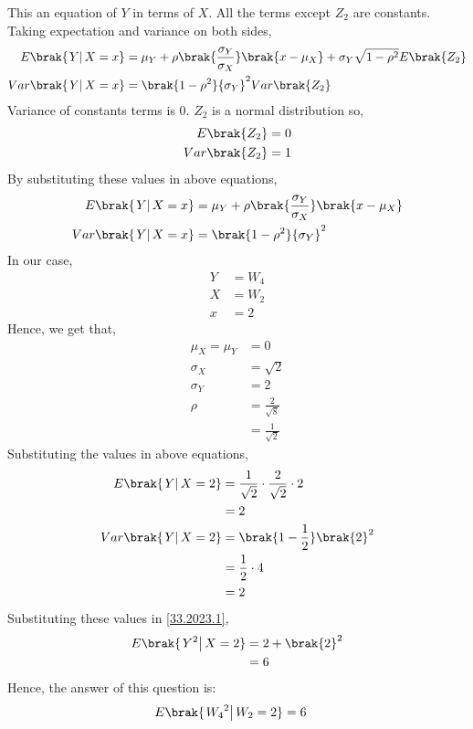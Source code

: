 \documentclass[journal,12pt,twocolumn]{IEEEtran}
\theoremstyle{remark}
\begin{document}
This an equation of $Y$ in terms of $X$. All the terms except $Z_2$ are constants. Taking expectation and variance on both sides, 
\begin{align}
E\brak{\left.Y\right | X=x} &= \mu_Y +\rho\brak{\frac{\sigma_Y}{\sigma_X}}\brak{x - \mu_X} + \sigma_Y\sqrt{1 - {\rho}^2}E\brak{Z_2}\\
Var\brak{\left.Y\right | X=x} &= {\brak{1 - {\rho}^2}{\sigma_Y}^2}Var\brak{Z_2}
\end{align}
Variance of constants terms is 0. $Z_2$ is a normal distribution so,
\begin{align}
E\brak{Z_2} &= 0\\
Var\brak{Z_2} &= 1
\end{align}
By substituting these values in above equations,
\begin{align}
E\brak{\left.Y\right | X=x} &= \mu_Y +\rho\brak{\frac{\sigma_Y}{\sigma_X}}\brak{x - \mu_X}\\
Var\brak{\left.Y\right | X=x} &= \brak{1 - {\rho}^2}{\sigma_Y}^2
\end{align}
In our case, 
\begin{align}
Y &= W_4\\
X &= W_2\\
x &= 2
\end{align}
Hence, we get that,
\begin{align}
\mu_X = \mu_Y &= 0\\ 
\sigma_X &= \sqrt{2}\\
\sigma_Y &= 2\\
\rho &= \frac{2}{\sqrt{8}}\\
     &= \frac{1}{\sqrt{2}}
\end{align} 
Substituting the values in above equations,
\begin{align}
E\brak{\left.Y\right | X=2} &= \frac{1}{\sqrt{2}}\cdot\frac{2}{\sqrt{2}}\cdot 2\\
			    &= 2\\
Var\brak{\left.Y\right | X=2} &= \brak{1 - \frac{1}{2}}\brak{2}^2\\
			      &= \frac{1}{2}\cdot 4\\
			      &= 2\\
\end{align}
Substituting these values in \eqref{33.2023.1},
\begin{align}
E\brak{\left.Y^2\right | X=2} &= 2 + \brak{2}^2\\
			      &= 6
\end{align}
Hence, the answer of this question is:
\begin{align}
E\brak{\left.{W_4}^2\right | W_2=2} &= 6
\end{align}
\end{document}
